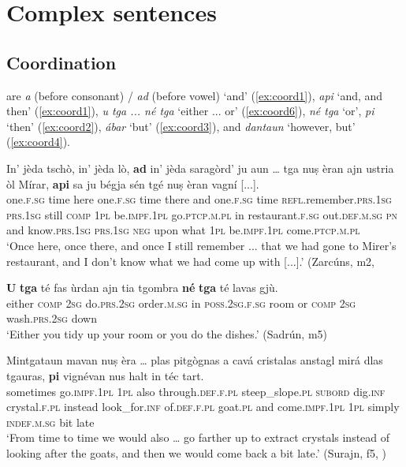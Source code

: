 \chapter{Complex sentences}

\section{Coordination}\label{sec:6.1}
 are \textit{a} (before consonant) / \textit{ad} (before vowel) `and' (\ref{ex:coord1}), \textit{api} `and, and then' (\ref{ex:coord1}), \textit{u tga ... né tga} `either ... or' (\ref{ex:coord6}),  \textit{né tga} `or', \textit{pi} `then' (\ref{ex:coord2}), \textit{ábar} `but' (\ref{ex:coord3}), and \textit{dantaun} `however, but' (\ref{ex:coord4}).

\ea
\label{ex:coord1}
\gll    In’ jèda tschò, in’ jèda lò, \textbf{ad} in’ jèda saragòrd’ ju aun … tga nuṣ èran  ajn ustria òl Mírar, \textbf{api} sa ju bégja sén tgé nuṣ èran vagní [...].\\
one.\textsc{f.sg} time here one.\textsc{f.sg} time there and one.\textsc{f.sg} time \textsc{refl}.remember.\textsc{prs.1sg} \textsc{prs.1sg} still {}  \textsc{comp} \textsc{1pl} be.\textsc{impf.1pl} go.\textsc{ptcp.m.pl} in restaurant.\textsc{f.sg} out.\textsc{def.m.sg} \textsc{pn} and  know.\textsc{prs.1sg} \textsc{prs.1sg} \textsc{neg} upon what \textsc{1pl} be.\textsc{impf.1pl} come.\textsc{ptcp.m.pl}\\
\glt `Once here, once there, and once I still remember ... that we had gone to Mirer's restaurant, and I don't know what we had come up with [...].' (Zarcúns, m2, 
\z

\ea
\label{ex:coord6}
\gll \textbf{U} \textbf{tga} té fas ùrdan ajn tia tgombra \textbf{né} \textbf{tga} té lavas gjù.\\
either \textsc{comp} \textsc{2sg} do.\textsc{prs.2sg} order.\textsc{m.sg} in \textsc{poss.2sg.f.sg} room or \textsc{comp} \textsc{2sg} wash.\textsc{prs.2sg} down\\
\glt`Either you tidy up your room or you do the dishes.' (Sadrún, m5)
\z

\ea
\label{ex:coord2}
\gll    Mintgataun mavan nuṣ èra … plas pitgògnas a cavá cristalas anstagl mirá dlas tgauras, \textbf{pi} vignévan nus halt in téc tart. \\
sometimes go.\textsc{impf.1pl} \textsc{1pl} also {} through.\textsc{def.f.pl} steep\_slope.\textsc{pl} \textsc{subord} dig.\textsc{inf} crystal.\textsc{f.pl} instead look\_for.\textsc{inf} of.\textsc{def.f.pl} goat.\textsc{pl} and come.\textsc{impf.1pl} \textsc{1pl} simply \textsc{indef.m.sg} bit late \\
\glt `From time to time we would also … go farther up to extract crystals instead of looking after the goats, and then we would come back a bit late.' (Surajn, f5, )
\z

